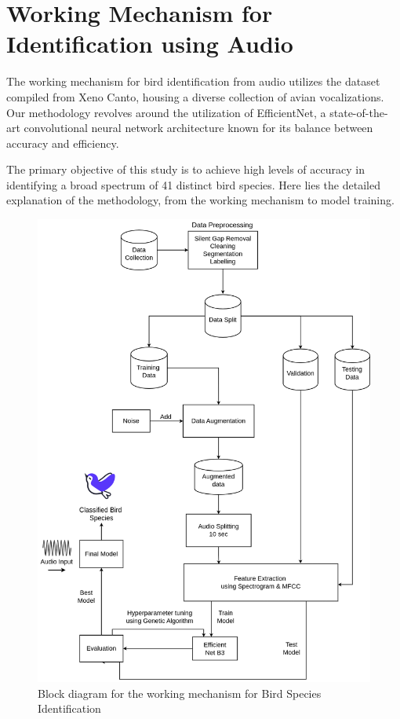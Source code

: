 \section{Working Mechanism for Identification using Audio}
The working mechanism for bird identification from audio utilizes the dataset compiled from Xeno Canto, housing a diverse collection of avian vocalizations. 
Our methodology revolves around the utilization of EfficientNet, a state-of-the-art convolutional neural network architecture known for 
its balance between accuracy and efficiency.

The primary objective of this study is to achieve high levels of accuracy in identifying a broad spectrum of 41 distinct bird species. 
Here lies the detailed explanation of the methodology, from the working mechanism to model training.
\begin{figure}[h!]
    \centering
    \includegraphics[scale=0.33]{images/IdentificationMethodology.png}
    \caption{Block diagram for the working mechanism for Bird Species Identification}%
\end{figure}
\newpage

